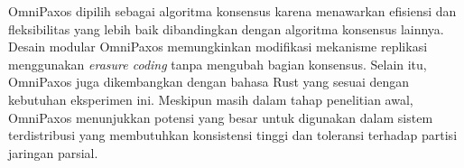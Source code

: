 OmniPaxos dipilih sebagai algoritma konsensus karena menawarkan efisiensi dan fleksibilitas yang lebih baik dibandingkan dengan algoritma konsensus lainnya. Desain modular OmniPaxos memungkinkan modifikasi mekanisme replikasi menggunakan \textit{erasure coding} tanpa mengubah bagian konsensus. Selain itu, OmniPaxos juga dikembangkan dengan bahasa Rust yang sesuai dengan kebutuhan eksperimen ini. Meskipun masih dalam tahap penelitian awal, OmniPaxos menunjukkan potensi yang besar untuk digunakan dalam sistem terdistribusi yang membutuhkan konsistensi tinggi dan toleransi terhadap partisi jaringan parsial.

